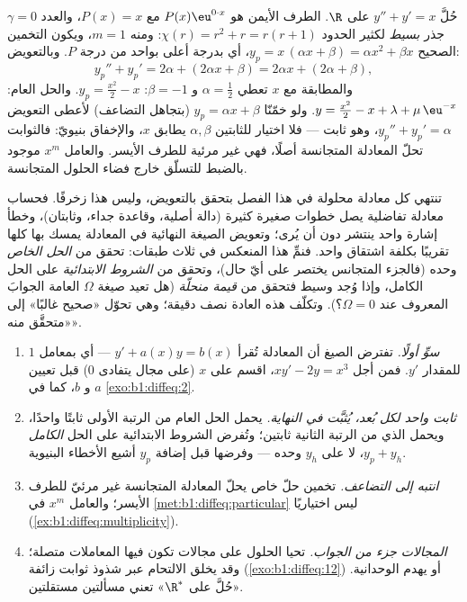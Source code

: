 \begin{example}\label{ex:b1:diffeq:multiplicity}
حُلَّ $y'' + y' = x$ على $\R$. الطرف الأيمن هو $P(x)\eu^{0
\cdot x}$ مع $P(x) = x$، والعدد $\gamma = 0$ جذر \emph{بسيط} لكثير الحدود $\chi(r) = r^2 + r = r(r + 1)$: ومنه $m = 1$، ويكون التخمين
الصحيح $y_p = x\,(\alpha x + \beta) = \alpha x^2 + \beta x$، أي بدرجة
أعلى بواحد من درجة $P$. وبالتعويض:
\[
y_p'' + y_p' = 2\alpha + (2\alpha x + \beta)
= 2\alpha x + (2\alpha + \beta) ,
\]
والمطابقة مع $x$ تعطي $\alpha = \frac12$ و $\beta = -1$:
$y_p = \frac{x^2}2 - x$. والحل العام: $y = \frac{x^2}2 - x +
\lambda + \mu\,\eu^{-x}$. ولو خمّنّا $y_p = \alpha x + \beta$
(بتجاهل التضاعف) لأعطى التعويض $y_p'' + y_p'
= \alpha$، وهو ثابت --- فلا اختيار للثابتين $\alpha, \beta$ يطابق
$x$، والإخفاق بنيويّ: فالثوابت تحلّ المعادلة
المتجانسة أصلًا، فهي غير مرئية للطرف الأيسر.
والعامل $x^m$ موجود بالضبط للتسلّق خارج فضاء الحلول
المتجانسة.
\end{example}

\begin{remark}\label{rem:b1:diffeq:check}
تنتهي كل معادلة محلولة في هذا الفصل بتحقق بالتعويض،
وليس هذا زخرفًا. فحساب معادلة تفاضلية
يصل خطوات صغيرة كثيرة (دالة أصلية، وقاعدة جداء،
وثابتان)، وخطأ إشارة واحد ينتشر دون أن يُرى؛
وتعويض الصيغة النهائية في المعادلة يمسك بها كلها
تقريبًا بكلفة اشتقاق واحد.
فنمِّ هذا المنعكس في ثلاث طبقات: تحقق من \emph{الحل
الخاص} وحده (فالجزء المتجانس يختصر على أيّ حال)، وتحقق من
\emph{الشروط الابتدائية} على الحل الكامل، وإذا وُجد
وسيط فتحقق من \emph{قيمة منحلّة} (هل تعيد
صيغة $\Omega$ العامة الجوابَ المعروف عند
$\Omega = 0$؟). وتكلّف هذه العادة نصف دقيقة؛ وهي تحوّل
«صحيح غالبًا» إلى «متحقَّق منه».
\end{remark}

\begin{remark}\label{rem:b1:diffeq:pitfalls}
\begin{enumerate}
  \item \emph{سوِّ أولًا.} تفترض الصيغ أن المعادلة
        تُقرأ $y' + a(x)y = b(x)$ --- أي بمعامل $1$ للمقدار $y'$.
        فمن أجل $xy' - 2y = x^3$، اقسم على $x$ (على مجال
        يتفادى $0$) قبل تعيين $a$ و $b$، كما في
        \cref{exo:b1:diffeq:2}.
  \item \emph{ثابت واحد لكل بُعد، يُثبَّت في النهاية.} يحمل
        الحل العام من الرتبة الأولى ثابتًا واحدًا، ويحمل
        الذي من الرتبة الثانية ثابتين؛ وتُفرض الشروط الابتدائية على
        الحل \emph{الكامل} $y_p + y_h$، لا على $y_h$
        وحده --- وفرضها قبل إضافة $y_p$ أشيع
        الأخطاء البنيوية.
  \item \emph{انتبه إلى التضاعف.} تخمين حلّ خاص
        يحلّ المعادلة المتجانسة غير مرئيّ للطرف
        الأيسر؛ والعامل $x^m$ في
        \cref{met:b1:diffeq:particular} ليس اختياريًا
        (\cref{ex:b1:diffeq:multiplicity}).
  \item \emph{المجالات جزء من الجواب.} تحيا الحلول
        على مجالات تكون فيها المعاملات متصلة؛
        وقد يخلق الالتحام عبر شذوذ ثوابت زائفة
        (\cref{exo:b1:diffeq:12}) أو يهدم الوحدانية.  «حُلَّ
        على $\R^*$» تعني مسألتين مستقلتين.
\end{enumerate}
\end{remark}

